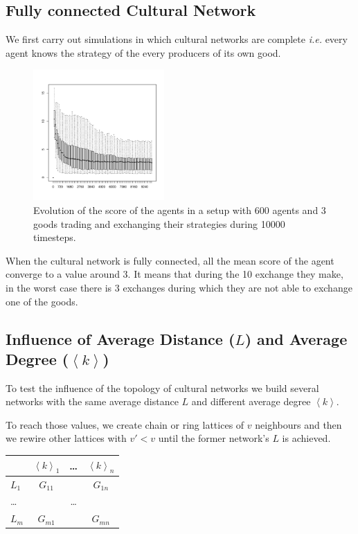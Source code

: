 \documentclass[a1paper,portrait,showframe,fontscale=.46]{baposter}
\begin{document}
\begin{poster}
{\begin{multicols}{2}
					\subsection*{Fully connected Cultural Network}
					We first carry out simulations in which cultural networks are complete \emph{i.e.} every agent knows the strategy of the every producers of its own good. 					
					\begin{figure}[H]
						\centering
						\begin{multicols}{2}
							\includegraphics[width=5cm]{img/full.pdf} 
							\caption{Evolution of the score of the agents in a setup with 600 agents and 3 goods trading and exchanging their strategies during 10000 timesteps.}%
							\label{fig:scoreEvol}
						\end{multicols}
					\end{figure}
					\vspace{-1cm}
					When the cultural network is fully connected, all the mean score of the agent converge to a value around 3. It means that during the 10 exchange they make, in the worst case there is 3 exchanges during which they are not able to exchange one of the goods.
					\subsection*{Influence of Average Distance ($L$) and Average Degree ($\left\langle k\right\rangle$)}
					\begin{multicols}{2}
						To test the influence of the topology of cultural networks we build several networks with the same average distance $L$ and different average degree $\left\langle k\right\rangle$. 
						
						To reach those values, we create chain or ring lattices of $v$ neighbours and then we rewire other lattices with $v'<v$ until the former network's $L$ is achieved.  
						\columnbreak
						\vspace{1cm}
						\begin{center}
							\large
							\begin{tabular}{l|ccc}
								& $\left\langle k\right\rangle_1$	 	& \dots & $\left\langle k\right\rangle_n$		\\\hline
								$L_1$	& $G_{11}$	& 	& $G_{1n}$	\\	
								\dots	&		&\dots	&		\\
								$L_m$	& $G_{m1}$	& 	& $G_{mn}$	\\	
							\end{tabular}
						\end{center}
					\end{multicols}


\end{multicols}}
\end{poster}
\end{document}
